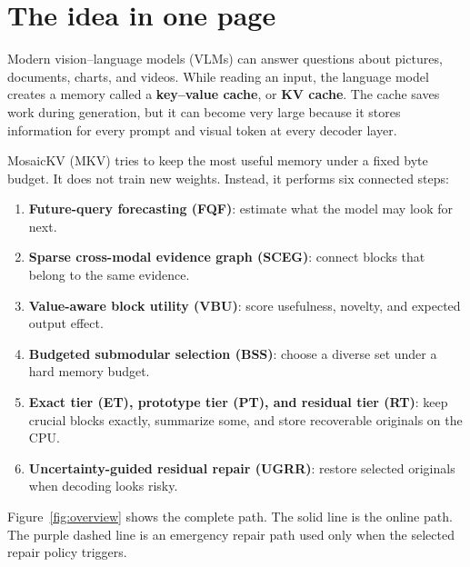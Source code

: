 \documentclass[11pt]{article}
\newcommand{\term}[1]{\textbf{#1}}
\begin{document}
\section{The idea in one page}

Modern vision--language models (VLMs) can answer questions about pictures, documents, charts, and videos.
While reading an input, the language model creates a memory called a \term{key--value cache}, or
\term{KV cache}. The cache saves work during generation, but it can become very large because it
stores information for every prompt and visual token at every decoder layer.

MosaicKV (MKV) tries to keep the most useful memory under a fixed byte budget. It does not train new
weights. Instead, it performs six connected steps:

\begin{enumerate}
  \item \term{Future-query forecasting (FQF)}: estimate what the model may look for next.
  \item \term{Sparse cross-modal evidence graph (SCEG)}: connect blocks that belong to the same evidence.
  \item \term{Value-aware block utility (VBU)}: score usefulness, novelty, and expected output effect.
  \item \term{Budgeted submodular selection (BSS)}: choose a diverse set under a hard memory budget.
  \item \term{Exact tier (ET), prototype tier (PT), and residual tier (RT)}: keep crucial blocks exactly, summarize some,
        and store recoverable originals on the CPU.
  \item \term{Uncertainty-guided residual repair (UGRR)}: restore selected originals when decoding looks risky.
\end{enumerate}

Figure~\ref{fig:overview} shows the complete path. The solid line is the online path. The purple
dashed line is an emergency repair path used only when the selected repair policy triggers.
\end{document}
